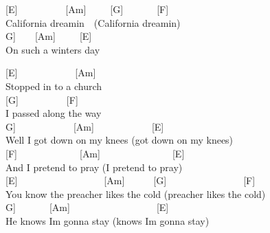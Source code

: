 \documentclass[
  letterpaper,
  a5paper]{memoir}
\begin{document}
\begin{tcolorbox}[enhanced jigsaw, breakable, bottomrule=.15mm, colframe=quarto-callout-color-frame, rightrule=.15mm, opacityback=0, colback=white, arc=.35mm, toprule=.15mm, leftrule=.75mm, left=2mm]

{[}E{]}~~~~~~~~~~{[}Am{]}~~~~~{[}G{]}~~~~~~~{[}F{]}\\
California dreamin~~(California dreamin\textquotesingle)\\
\hspace*{0.333em}\hspace*{0.333em}\hspace*{0.333em}{[}G{]}~~~~{[}Am{]}~~~~~{[}E{]}\\
On such a winter\textquotesingle s day

\end{tcolorbox}

{[}E{]}~~~~~~~~~~~~{[}Am{]}\\
Stopped in to a church\\
{[}G{]}~~~~~~~~~~{[}F{]}\\
I passed along the way\\
\hspace*{0.333em}\hspace*{0.333em}\hspace*{0.333em}\hspace*{0.333em}\hspace*{0.333em}\hspace*{0.333em}\hspace*{0.333em}{[}G{]}~~~~~~~~~~~~{[}Am{]}~~~~~~~~~~~~{[}E{]}\\
Well I got down on my knees (got down on my knees)\\
{[}F{]}~~~~~~~~~~~~~{[}Am{]}~~~~~~~~~~~~~~~{[}E{]}\\
And I pretend to pray (I pretend to pray)\\
{[}E{]}~~~~~~~~~~~~~~~~~~{[}Am{]}~~~~~~{[}G{]}~~~~~~~~~~~~~~~~{[}F{]}\\
You know the preacher likes the cold (preacher likes the cold)\\
\hspace*{0.333em}\hspace*{0.333em}\hspace*{0.333em}\hspace*{0.333em}\hspace*{0.333em}\hspace*{0.333em}\hspace*{0.333em}\hspace*{0.333em}{[}G{]}~~~~~~~{[}Am{]}~~~~~~~~~~~~~~~~~~{[}E{]}\\
He knows I\textquotesingle m gonna stay (knows I\textquotesingle m gonna
stay)
\end{document}
